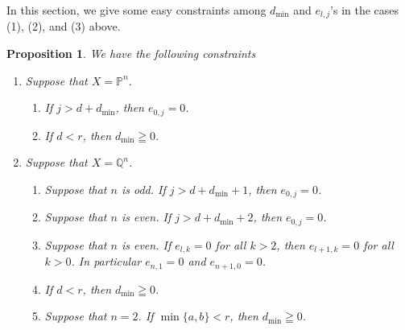 \documentclass[a4paper,12pt]{amsart}
\newtheorem{prop}[thm]{Proposition}%
\begin{document}
In this section, we give some easy constraints among $d_{\min}$ and $e_{l,j}$'s in the cases 
(1), (2), and (3) above.

\begin{prop}\label{firstConstraint} 
We have the following constraints
\begin{enumerate} 
\item[(1)] Suppose that $X=\mathbb{P}^n$.
\begin{enumerate}
\item If $j>d+d_{\min}$, then $e_{0,j}=0$. 
\item If $d<r$, then $d_{\min}\geqq 0$.
\end{enumerate}
\item[(2)] Suppose that $X=\mathbb{Q}^{n}$.
\begin{enumerate}
\item Suppose that $n$ is odd. If $j>d+d_{\min}+1$, then $e_{0,j}=0$. 
\item Suppose that $n$ is even. If $j>d+d_{\min}+2$, then $e_{0,j}=0$. 
\item Suppose that $n$ is even. If $e_{l,k}=0$ for all $k>2$, then $e_{l+1,k}=0$ for all $k>0$.
In particular $e_{n,1}=0$ and $e_{n+1,0}=0$.
\item If $d<r$, then $d_{\min}\geqq 0$.
\item Suppose that $n=2$. If $\min \{a,b\}<r$, then $d_{\min}\geqq 0$.
\end{enumerate}
\end{enumerate}
\end{prop}
\end{document}
